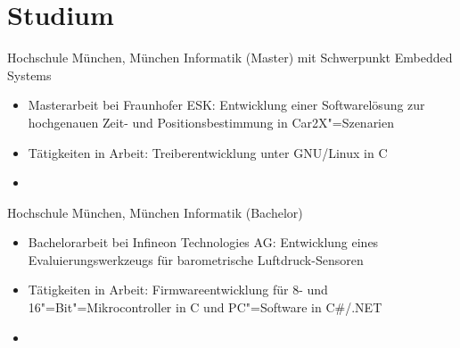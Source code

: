 \documentclass[%
               doublesided,
               paper=a4,
               fontsize=10pt
              ]{my-resume}
\begin{document}
{    \section[\faMortarBoard]{Studium}
        {Hochschule München, München}
        {Informatik (Master) mit Schwerpunkt Embedded Systems}
        {\begin{itemize}
            \item Masterarbeit bei Fraunhofer ESK: Entwicklung einer Softwarelösung zur hochgenauen Zeit- und Positionsbestimmung in Car2X"=Szenarien
            \item Tätigkeiten in Arbeit: Treiberentwicklung unter GNU/Linux in C
            \item[]  
        \end{itemize}}
    
        {Hochschule München, München}
        {Informatik (Bachelor)}
        {\begin{itemize}
            \item Bachelorarbeit bei Infineon Technologies AG: Entwicklung eines Evaluierungswerkzeugs für barometrische Luftdruck-Sensoren
            \item Tätigkeiten in Arbeit: Firmwareentwicklung für 8- und 16"=Bit"=Mikrocontroller in C und PC"=Software in C\#/.NET
            \item[]   
        \end{itemize}}
    
    
}
\makebody
\clearpage
\end{document}
